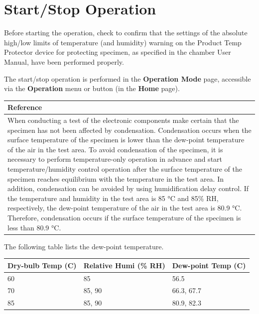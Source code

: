 \section{Start/Stop Operation}

Before starting the operation, check to confirm that the settings of the
absolute high/low limits of temperature (and humidity) warning on the
Product Temp Protector device for protecting specimen, as specified in
the chamber User Manual, have been performed properly.

The start/stop operation is performed in the \textbf{Operation Mode}
page, accessible via the \textbf{Operation} menu or button (in the
\textbf{Home} page).

\begin{longtable}[]{@{}l@{}}
\toprule
\begin{minipage}[b]{0.97\columnwidth}\raggedright
\textbf{Reference}\strut
\end{minipage}\tabularnewline
\midrule
\endhead
\begin{minipage}[t]{0.97\columnwidth}\raggedright
When conducting a test of the electronic components make certain that
the specimen has not been affected by condensation. Condensation occurs
when the surface temperature of the specimen is lower than the dew-point
temperature of the air in the test area. To avoid condensation of the
specimen, it is necessary to perform temperature-only operation in
advance and start temperature/humidity control operation after the
surface temperature of the specimen reaches equilibrium with the
temperature in the test area. In addition, condensation can be avoided
by using humidification delay control. If the temperature and humidity
in the test area is 85 °C and 85\% RH, respectively, the dew-point
temperature of the air in the test area is 80.9 °C. Therefore,
condensation occurs if the surface temperature of the specimen is less
than 80.9 °C.\strut
\end{minipage}\tabularnewline
\bottomrule
\end{longtable}

The following table lists the dew-point temperature.

\begin{longtable}[]{@{}lll@{}}
\toprule
Dry-bulb Temp (C) & Relative Humi (\% RH) & Dew-point Temp
(C)\tabularnewline
\midrule
\endhead
60 & 85 & 56.5\tabularnewline
70 & 85, 90 & 66.3, 67.7\tabularnewline
85 & 85, 90 & 80.9, 82.3\tabularnewline
\bottomrule
\end{longtable}


